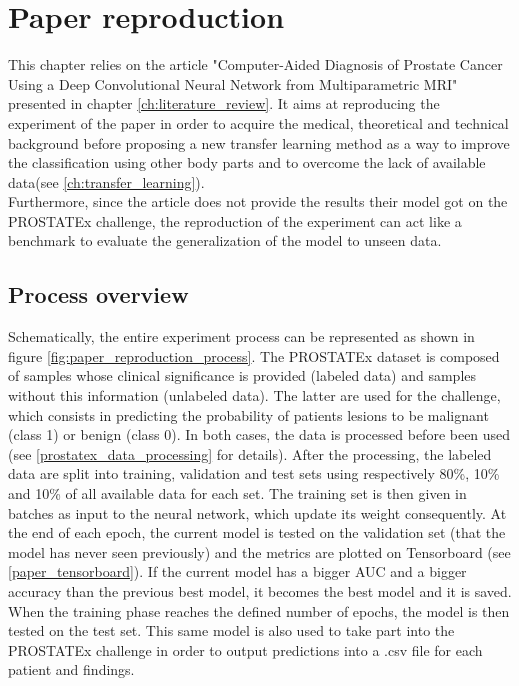 
\chapter{Paper reproduction}
\label{ch:paper_reproduction}
This chapter relies on the article "Computer-Aided Diagnosis of Prostate Cancer Using a Deep Convolutional Neural Network from Multiparametric MRI"\cite{07} presented in chapter \ref{ch:literature_review}. It aims at reproducing the experiment of the paper in order to acquire the medical, theoretical and technical background before proposing a new transfer learning method as a way to improve the classification using other body parts and to overcome the lack of available data(see \ref{ch:transfer_learning}).\\

Furthermore, since the article does not provide the results their model got on the PROSTATEx challenge, the reproduction of the experiment can act like a benchmark to evaluate the generalization of the model to unseen data. 

\section{Process overview}
Schematically, the entire experiment process can be represented as shown in figure \ref{fig:paper_reproduction_process}. The PROSTATEx dataset is composed of samples whose clinical significance is provided (labeled data) and samples without this information (unlabeled data). The latter are used for the challenge, which consists in predicting the probability of patients lesions to be malignant (class 1) or benign (class 0). In both cases, the data is processed before been used (see \ref{prostatex_data_processing} for details). After the processing, the labeled data are split into training, validation and test sets using respectively 80\%, 10\% and 10\% of all available data for each set. The training set is then given in batches as input to the neural network, which update its weight consequently. At the end of each epoch, the current model is tested on the validation set (that the model has never seen previously) and the metrics are plotted on Tensorboard (see \ref{paper_tensorboard}). If the current model has a bigger AUC and a bigger accuracy than the previous best model, it becomes the best model and it is saved.  When the training phase reaches the defined number of epochs, the model is then tested on the test set. This same model is also used to take part into the PROSTATEx challenge in order to output predictions into a .csv file for each patient and findings.


